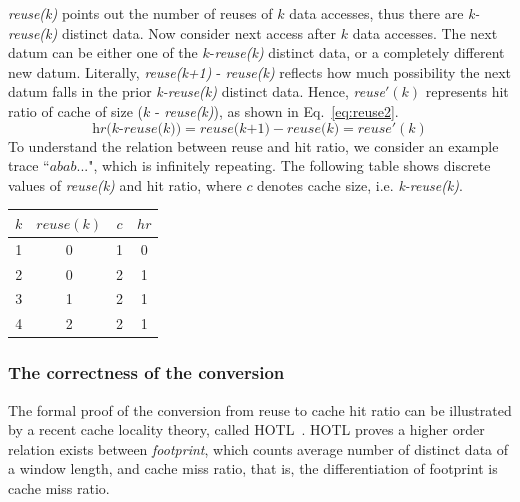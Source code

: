 \documentclass[preprint,nocopyrightspace,10pt]{sigplanconf}
\begin{document}
\emph{reuse(k)} points out the number of reuses of $k$ data accesses, thus there
are \emph{k-reuse(k)} distinct data. Now consider next access after $k$ data accesses. 
The next datum can be either one of the $k$-\emph{reuse(k)} distinct data, or a completely 
different new datum. Literally, \emph{reuse(k+1)} - \emph{reuse(k)} reflects how 
much possibility the next datum falls in the prior \emph{k-reuse(k)} distinct data. Hence, 
\emph{reuse}$'(k)$ represents hit ratio of cache of size ($k$ - \emph{reuse(k)}), as shown in 
Eq.~\ref{eq:reuse2}.
\begin{equation}
\textit{hr(k-reuse(k))} = \textit{reuse(k+1)} - \textit{reuse(k)} = \textit{reuse}'(k)
\label{eq:reuse2}
\end{equation}
\noindent
To understand the relation between reuse and hit ratio, we consider an example
trace ``$abab...$", which is infinitely repeating. The following table shows discrete
values of \emph{reuse(k)} and hit ratio, where $c$ denotes cache size, i.e.  \emph{k-reuse(k)}.
\begin{center}
\begin{tabular}{cc|cc}
$k$ & $reuse(k)$ & $c$ & $hr$ \\ \hline
1 & 0 & 1 & 0    \\
2 & 0 & 2 & 1    \\
3 & 1 & 2 & 1    \\
4 & 2 & 2 & 1   
\end{tabular}
\end{center}
\subsubsection{The correctness of the conversion}

The formal proof of the conversion from reuse to cache hit ratio can be illustrated by 
a recent cache locality theory, called HOTL~\cite{Xiang+:ASPLOS13}. HOTL proves
a higher order relation exists between \emph{footprint}, which counts average number of 
distinct data of a window length, and cache miss ratio, that is, the differentiation of footprint
is cache miss ratio.
\end{document}
